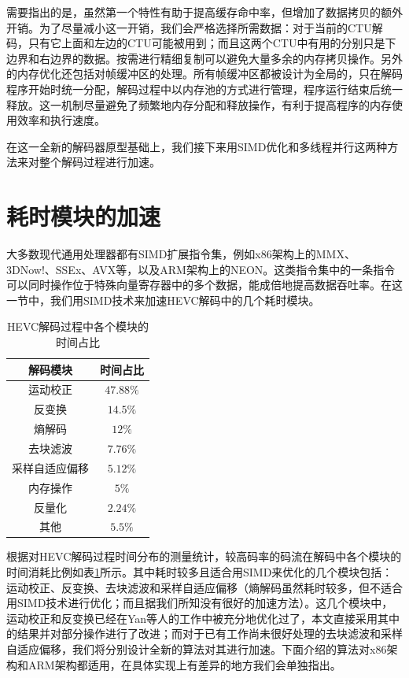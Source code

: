 需要指出的是，虽然第一个特性有助于提高缓存命中率，但增加了数据拷贝的额外开销。为了尽量减小这一开销，我们会严格选择所需数据：对于当前的CTU解码，只有它上面和左边的CTU可能被用到；而且这两个CTU中有用的分别只是下边界和右边界的数据。按需进行精细复制可以避免大量多余的内存拷贝操作。另外的内存优化还包括对帧缓冲区的处理。所有帧缓冲区都被设计为全局的，只在解码程序开始时统一分配，解码过程中以内存池的方式进行管理，程序运行结束后统一释放。这一机制尽量避免了频繁地内存分配和释放操作，有利于提高程序的内存使用效率和执行速度。

在这一全新的解码器原型基础上，我们接下来用SIMD优化和多线程并行这两种方法来对整个解码过程进行加速。

\section{耗时模块的加速}

大多数现代通用处理器都有SIMD扩展指令集，例如x86架构上的MMX、3DNow!、SSEx、AVX等\supercite{Intel-manual}，以及ARM架构上的NEON\supercite{ARM-manual}。这类指令集中的一条指令可以同时操作位于特殊向量寄存器中的多个数据，能成倍地提高数据吞吐率。在这一节中，我们用SIMD技术来加速HEVC解码中的几个耗时模块。

\begin{table}
	\begin{center}
		\caption{HEVC解码过程中各个模块的时间占比} \label{table:HEVC_timing}
		\renewcommand{\arraystretch}{1.5}
		\begin{tabular}{c|c}
			\hline
			\textbf{解码模块} & \textbf{时间占比} \\
			\hline
			\hline
			运动校正 & $47.88\%$ \\
			\hline
			反变换 & $14.5\%$ \\
			\hline
			熵解码 & $12\%$ \\
			\hline
			去块滤波 & $7.76\%$ \\
			\hline
			采样自适应偏移 & $5.12\%$ \\
			\hline
			内存操作 & $5\%$ \\
			\hline
			反量化 & $2.24\%$ \\
			\hline
			其他 & $5.5\%$ \\
			\hline
		\end{tabular}
	\end{center}
\end{table}

根据对HEVC解码过程时间分布的测量统计\supercite{Duan2014}，较高码率的码流在解码中各个模块的时间消耗比例如表\ref{table:HEVC_timing}所示。其中耗时较多且适合用SIMD来优化的几个模块包括：运动校正、反变换、去块滤波和采样自适应偏移（熵解码虽然耗时较多，但不适合用SIMD技术进行优化；而且据我们所知没有很好的加速方法）。这几个模块中，运动校正和反变换已经在Yan等人的工作\supercite{Yan-VCIP2012}中被充分地优化过了，本文直接采用其中的结果并对部分操作进行了改进；而对于已有工作尚未很好处理的去块滤波和采样自适应偏移，我们将分别设计全新的算法对其进行加速。下面介绍的算法对x86架构和ARM架构都适用，在具体实现上有差异的地方我们会单独指出。

